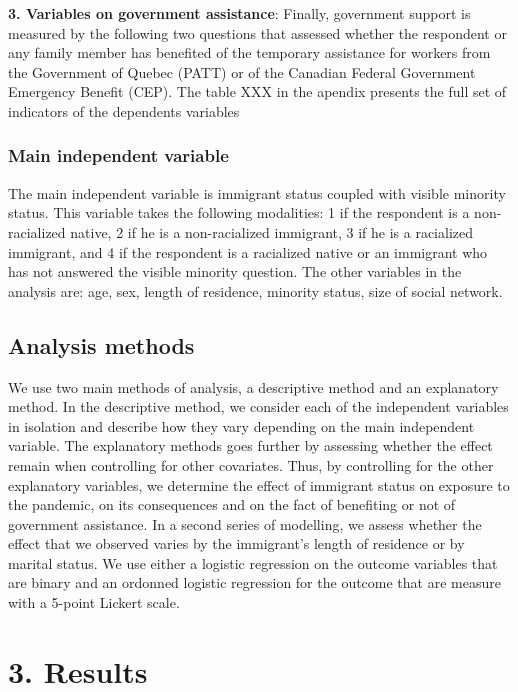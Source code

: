 \documentclass[
]{article}
\begin{document}
\textbf{3. Variables on government assistance}: Finally, government support is
measured by the following two questions that assessed whether the respondent or
any family member has benefited of the temporary assistance for workers from the
Government of Quebec (PATT) or of the Canadian Federal Government Emergency
Benefit (CEP). The table XXX in the apendix presents the full set of indicators
of the dependents variables

\hypertarget{main-independent-variable}{%
\subsubsection{Main independent variable}\label{main-independent-variable}}

The main independent variable is immigrant status coupled with visible minority
status. This variable takes the following modalities: 1 if the respondent is a
non-racialized native, 2 if he is a non-racialized immigrant, 3 if he is a
racialized immigrant, and 4 if the respondent is a racialized native or an
immigrant who has not answered the visible minority question. The other
variables in the analysis are: age, sex, length of residence, minority status,
size of social network.

\hypertarget{analysis-methods}{%
\subsection{Analysis methods}\label{analysis-methods}}

We use two main methods of analysis, a descriptive method and an explanatory
method. In the descriptive method, we consider each of the independent variables
in isolation and describe how they vary depending on the main independent
variable. The explanatory methods goes further by assessing whether the effect
remain when controlling for other covariates. Thus, by controlling for the other
explanatory variables, we determine the effect of immigrant status on exposure
to the pandemic, on its consequences and on the fact of benefiting or not of
government assistance. In a second series of modelling, we assess whether the
effect that we observed varies by the immigrant's length of residence or by
marital status. We use either a logistic regression on the outcome variables
that are binary and an ordonned logistic regression for the outcome that are
measure with a 5-point Lickert scale.

\newpage

\hypertarget{results}{%
\section{3. Results}\label{results}}
\end{document}
